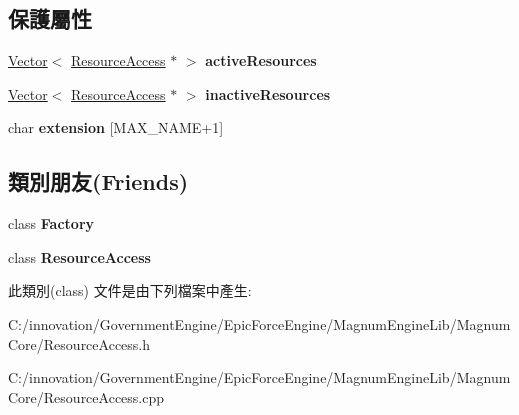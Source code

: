 \subsection*{保護屬性}
\begin{DoxyCompactItemize}
\item 
\hyperlink{class_i_dream_sky_1_1_vector}{Vector}$<$ \hyperlink{class_i_dream_sky_1_1_resource_access}{Resource\+Access} $\ast$ $>$ {\bfseries active\+Resources}\hypertarget{class_i_dream_sky_1_1_resource_access_1_1_i_creator_a1a650b060f58cd713be910e590193213}{}\label{class_i_dream_sky_1_1_resource_access_1_1_i_creator_a1a650b060f58cd713be910e590193213}

\item 
\hyperlink{class_i_dream_sky_1_1_vector}{Vector}$<$ \hyperlink{class_i_dream_sky_1_1_resource_access}{Resource\+Access} $\ast$ $>$ {\bfseries inactive\+Resources}\hypertarget{class_i_dream_sky_1_1_resource_access_1_1_i_creator_a0f8258bd66169fb854eee2908c0a9845}{}\label{class_i_dream_sky_1_1_resource_access_1_1_i_creator_a0f8258bd66169fb854eee2908c0a9845}

\item 
char {\bfseries extension} \mbox{[}M\+A\+X\+\_\+\+N\+A\+ME+1\mbox{]}\hypertarget{class_i_dream_sky_1_1_resource_access_1_1_i_creator_a2b1fa584e697bcfed3732dc856395941}{}\label{class_i_dream_sky_1_1_resource_access_1_1_i_creator_a2b1fa584e697bcfed3732dc856395941}

\end{DoxyCompactItemize}
\subsection*{類別朋友(Friends)}
\begin{DoxyCompactItemize}
\item 
class {\bfseries Factory}\hypertarget{class_i_dream_sky_1_1_resource_access_1_1_i_creator_a328c093d609680cca505905c6d49901a}{}\label{class_i_dream_sky_1_1_resource_access_1_1_i_creator_a328c093d609680cca505905c6d49901a}

\item 
class {\bfseries Resource\+Access}\hypertarget{class_i_dream_sky_1_1_resource_access_1_1_i_creator_a3a26a4a200b91c31f27b5e173018a17c}{}\label{class_i_dream_sky_1_1_resource_access_1_1_i_creator_a3a26a4a200b91c31f27b5e173018a17c}

\end{DoxyCompactItemize}


此類別(class) 文件是由下列檔案中產生\+:\begin{DoxyCompactItemize}
\item 
C\+:/innovation/\+Government\+Engine/\+Epic\+Force\+Engine/\+Magnum\+Engine\+Lib/\+Magnum\+Core/Resource\+Access.\+h\item 
C\+:/innovation/\+Government\+Engine/\+Epic\+Force\+Engine/\+Magnum\+Engine\+Lib/\+Magnum\+Core/Resource\+Access.\+cpp\end{DoxyCompactItemize}
